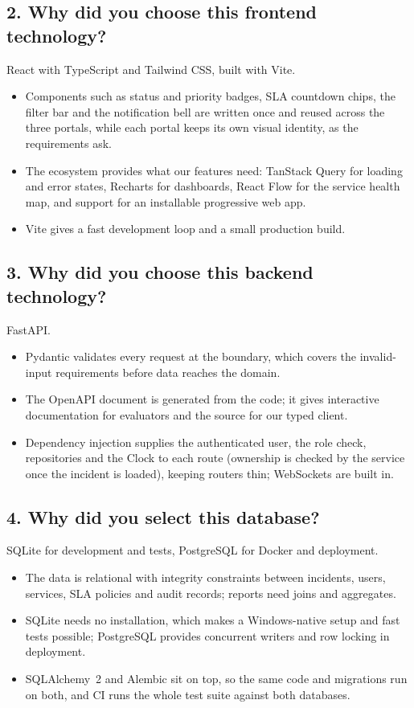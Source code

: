 \subsection*{2. Why did you choose this frontend technology?}
React with TypeScript and Tailwind CSS, built with Vite.
\begin{itemize}
  \item Components such as status and priority badges, SLA countdown chips, the filter bar and
    the notification bell are written once and reused across the three portals, while each
    portal keeps its own visual identity, as the requirements ask.
  \item The ecosystem provides what our features need: TanStack Query for loading and error
    states, Recharts for dashboards, React Flow for the service health map, and support for an
    installable progressive web app.
  \item Vite gives a fast development loop and a small production build.
\end{itemize}

\subsection*{3. Why did you choose this backend technology?}
FastAPI.
\begin{itemize}
  \item Pydantic validates every request at the boundary, which covers the invalid-input
    requirements before data reaches the domain.
  \item The OpenAPI document is generated from the code; it gives interactive documentation
    for evaluators and the source for our typed client.
  \item Dependency injection supplies the authenticated user, the role check, repositories and
    the Clock to each route (ownership is checked by the service once the incident is loaded), keeping routers thin; WebSockets are built in.
\end{itemize}

\subsection*{4. Why did you select this database?}
SQLite for development and tests, PostgreSQL for Docker and deployment.
\begin{itemize}
  \item The data is relational with integrity constraints between incidents, users, services,
    SLA policies and audit records; reports need joins and aggregates.
  \item SQLite needs no installation, which makes a Windows-native setup and fast tests
    possible; PostgreSQL provides concurrent writers and row locking in deployment.
  \item SQLAlchemy~2 and Alembic sit on top, so the same code and migrations run on both, and
    CI runs the whole test suite against both databases.
\end{itemize}

